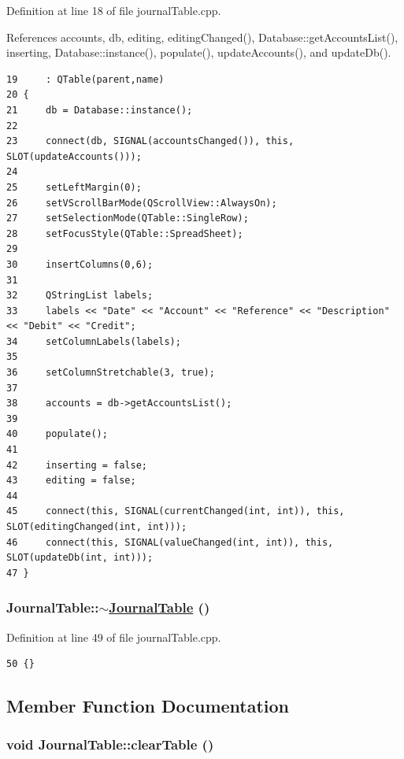 Definition at line 18 of file journal\-Table.cpp.

References accounts, db, editing, editing\-Changed(), Database::get\-Accounts\-List(), inserting, Database::instance(), populate(), update\-Accounts(), and update\-Db().

\footnotesize\begin{verbatim}19     : QTable(parent,name)  
20 {
21     db = Database::instance();
22     
23     connect(db, SIGNAL(accountsChanged()), this, SLOT(updateAccounts()));
24         
25     setLeftMargin(0);
26     setVScrollBarMode(QScrollView::AlwaysOn);
27     setSelectionMode(QTable::SingleRow);
28     setFocusStyle(QTable::SpreadSheet);
29     
30     insertColumns(0,6);
31     
32     QStringList labels;
33     labels << "Date" << "Account" << "Reference" << "Description" << "Debit" << "Credit";
34     setColumnLabels(labels);
35               
36     setColumnStretchable(3, true);
37     
38     accounts = db->getAccountsList();
39     
40     populate();
41     
42     inserting = false;
43     editing = false;
44     
45     connect(this, SIGNAL(currentChanged(int, int)), this, SLOT(editingChanged(int, int)));
46     connect(this, SIGNAL(valueChanged(int, int)), this, SLOT(updateDb(int, int)));    
47 }
\end{verbatim}\normalsize 


\hypertarget{classJournalTable_a1}{
\subsubsection[$\sim$JournalTable]{\setlength{\rightskip}{0pt plus 5cm}Journal\-Table::$\sim$\hyperlink{classJournalTable}{Journal\-Table} ()}}
\label{classJournalTable_a1}


Definition at line 49 of file journal\-Table.cpp.

\footnotesize\begin{verbatim}50 {}
\end{verbatim}\normalsize 




\subsection{Member Function Documentation}
\hypertarget{classJournalTable_a6}{
\subsubsection[clearTable]{\setlength{\rightskip}{0pt plus 5cm}void Journal\-Table::clear\-Table ()}}
\label{classJournalTable_a6}


